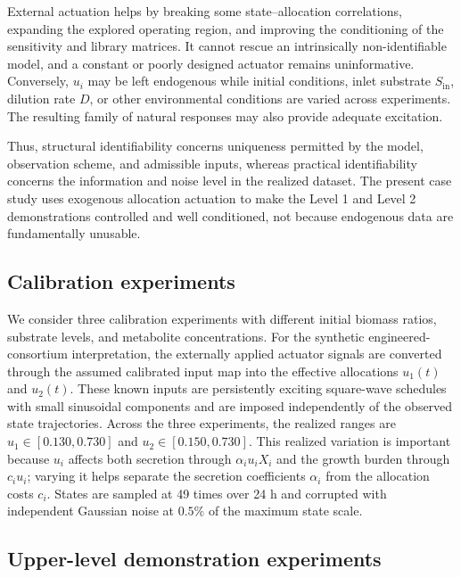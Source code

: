 \documentclass[11pt,a4paper]{article}
\begin{document}
External actuation helps by breaking some state--allocation correlations,
expanding the explored operating region, and improving the conditioning of
the sensitivity and library matrices. It cannot rescue an intrinsically
non-identifiable model, and a constant or poorly designed actuator remains
uninformative. Conversely, \(u_i\) may be left endogenous while initial
conditions, inlet substrate \(S_{\mathrm{in}}\), dilution rate \(D\), or other
environmental conditions are varied across experiments. The resulting family
of natural responses may also provide adequate excitation.

Thus, structural identifiability concerns uniqueness permitted by the model,
observation scheme, and admissible inputs, whereas practical identifiability
concerns the information and noise level in the realized dataset. The present
case study uses exogenous allocation actuation to make the Level 1 and Level 2
demonstrations controlled and well conditioned, not because endogenous data
are fundamentally unusable.

\subsection{Calibration experiments}

We consider three calibration experiments with different initial biomass ratios, substrate
levels, and metabolite concentrations. For the synthetic engineered-consortium
interpretation, the externally applied actuator signals are converted through
the assumed calibrated input map into the effective allocations \(u_1(t)\)
and \(u_2(t)\). These known inputs are persistently exciting square-wave
schedules with small sinusoidal components and are imposed independently of
the observed state trajectories. Across the three experiments, the realized
ranges are \(u_1\in[0.130,0.730]\) and \(u_2\in[0.150,0.730]\). %
This realized
variation is important because \(u_i\) affects both secretion through
\(\alpha_i u_iX_i\) and the growth burden through \(c_i u_i\); varying it
helps separate the secretion coefficients \(\alpha_i\) from the allocation
costs \(c_i\). States are sampled at 49 times over 24 h and corrupted
with independent Gaussian noise at \(0.5\%\) of the maximum state scale.

\subsection{Upper-level demonstration experiments}
\end{document}
